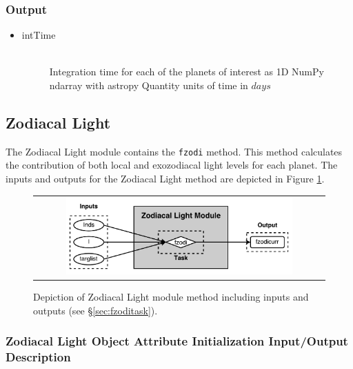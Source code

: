 \documentclass[cleanfoot]{asme2ej}
\newcommand{\reffig}[1]{Figure \ref{#1}}
\begin{document}
\subsubsection*{Output}
\begin{itemize}
    \item 
    \begin{description}
        \item[intTime] \hfill \\
        Integration time for each of the planets of interest as 1D NumPy ndarray with astropy Quantity units of time in $ days $
    \end{description}
\end{itemize}


\subsection{Zodiacal Light}\label{sec:zodiacallight}

The Zodiacal Light module contains the \verb+fzodi+ method.  This method calculates the contribution of both local and exozodiacal light levels for each planet.  The inputs and outputs for the Zodiacal Light method are depicted in \reffig{fig:zodiacallightmodule}.

\begin{figure}[ht]
    \begin{center}
        \begin{tabular}{c}
             \includegraphics[width=0.8\textwidth]{ZodiTasks}
        \end{tabular}
    \end{center}
    \caption{\label{fig:zodiacallightmodule} Depiction of Zodiacal Light module method including inputs and outputs (see \S\ref{sec:fzoditask}).}
\end{figure}

\subsubsection{Zodiacal Light Object Attribute Initialization Input/Output Description}
\end{document}
